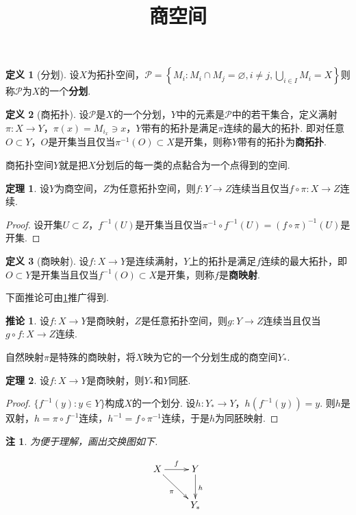 \documentclass[12pt]{ctexart}
\title{\vspace{-2em}\textbf{商空间}\vspace{-2em}}
\date{ }
\theoremstyle{definition}
\newtheorem{definition}{定义}
\newtheorem{theorem}{定理}
\newtheorem{corollary}{推论}
\theoremstyle{plain}
\newtheorem*{remark}{注}
\begin{document}
	\maketitle
	\begin{definition}[分划]
		设$X$为拓扑空间，$\mathcal{P}=\left\{M_i:M_i\cap M_j=\varnothing, i\neq j,\bigcup_{i\in I}M_i=X\right\}$则称$\mathcal{P}$为$X$的一个\textbf{分划}.
	\end{definition}
	\begin{definition}[商拓扑]
		设$\mathcal{P}$是$X$的一个分划，$Y$中的元素是$\mathcal{P}$中的若干集合，定义满射$\pi:X\to Y$，$\pi(x)=M_{i_x}\ni x$，$Y$带有的拓扑是满足$\pi$连续的最大的拓扑. 即对任意$O\subset Y$，$O$是开集当且仅当$\pi^{-1}(O)\subset X$是开集，则称$Y$带有的拓扑为\textbf{商拓扑}.
	\end{definition}
	商拓扑空间$Y$就是把$X$分划后的每一类的点黏合为一个点得到的空间.
	\begin{theorem}\label{natrual}
		设$Y$为商空间，$Z$为任意拓扑空间，则$f:Y\to Z$连续当且仅当$f\circ\pi:X\to Z$连续.
	\end{theorem}
	\begin{proof}
		设开集$U\subset Z$，$f^{-1}(U)$是开集当且仅当$\pi^{-1}\circ f^{-1}(U)=\left(f\circ\pi\right)^{-1}(U)$是开集.
	\end{proof}
	\begin{definition}[商映射]
		设$f:X\to Y$是连续满射，$Y$上的拓扑是满足$f$连续的最大拓扑，即$O\subset Y$是开集当且仅当$f^{-1}(O)\subset X$是开集，则称$f$是\textbf{商映射}.
	\end{definition}
	下面推论可由\ref{natrual}推广得到.
	\begin{corollary}
		设$f:X\to Y$是商映射，$Z$是任意拓扑空间，则$g:Y\to Z$连续当且仅当$g\circ f:X\to Z$连续.
	\end{corollary}
	自然映射$\pi$是特殊的商映射，将$X$映为它的一个分划生成的商空间$Y_{*}$.
	\begin{theorem}
		设$f:X\to Y$是商映射，则$Y_{*}$和$Y$同胚.
	\end{theorem}
	\begin{proof}
		$\{f^{-1}(y):y\in Y\}$构成$X$的一个划分. 设$h:Y_{*}\to Y$，$h(f^{-1}(y))=y$. 则$h$是双射，$h=\pi\circ f^{-1}$连续，$h^{-1}=f\circ\pi^{-1}$连续，于是$h$为同胚映射.
	\end{proof}
	\begin{remark}
		为便于理解，画出交换图如下. 
	\end{remark}
	\begin{displaymath}
		\xymatrix{ 
			X \ar[r]^f \ar[dr]_{\pi} & Y \ar[d]^h \\
					 		& Y_{*}  
		}
	\end{displaymath}
\end{document}
